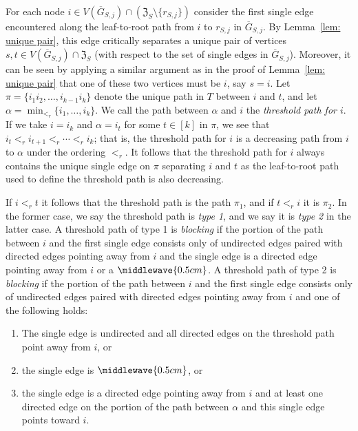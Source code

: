 For each node $i\in V(\overline{G}_{S,j})\cap(\mathfrak{Z}_S\setminus\{r_{S,j}\})$ consider the first single edge encountered along the leaf-to-root path from $i$ to $r_{S,j}$ in $\overline{G}_{S,j}$.  
By Lemma~\ref{lem: unique pair}, this edge critically separates a unique pair of vertices $s,t\in V(\overline{G}_{S,j})\cap\mathfrak{Z}_S$ (with respect to the set of single edges in $\overline{G}_{S,j}$). 
Moreover, it can be seen by applying a similar argument as in the proof of Lemma~\ref{lem: unique pair} that one of these two vertices must be $i$, say $s = i$. 
Let $\pi = \{i_1i_2,\ldots, i_{k-1}i_k\}$ denote the unique path in $T$ between $i$ and $t$, and let $\alpha = \min_{<_r}\{i_1,\ldots, i_k\}$. 
We call the path between $\alpha$ and $i$ the \emph{threshold path for $i$}.
If we take $i = i_k$ and $\alpha = i_t$ for some $t\in[k]$ in $\pi$, we see that $i_{t} <_r i_{t+1} <_r \cdots <_r i_k$; that is, the threshold path for $i$ is a decreasing path from $i$ to $\alpha$ under the ordering $<_r$. 
It follows that the threshold path for $i$ always contains the unique single edge on $\pi$ separating $i$ and $t$ as the leaf-to-root path used to define the threshold path is also decreasing. 

If $i<_r t$ it follows that the threshold path is the path $\pi_1$, and if $t <_r i$ it is $\pi_2$. 
In the former case, we say the threshold path is \emph{type 1}, and we say it is \emph{type 2} in the latter case. 
A threshold path of type 1 is \emph{blocking} if the portion of the path between $i$ and the first single edge consists only of undirected edges paired with directed edges pointing away from $i$ and the single edge is a directed edge pointing away from $i$ or a $\middlewave{0.5cm}$. 
A threshold path of type 2 is \emph{blocking} if the portion of the path between $i$ and the first single edge consists only of undirected edges paired with directed edges pointing away from $i$ and one of the following holds:
\begin{enumerate}
    \item The single edge is undirected and all directed edges on the threshold path point away from $i$, or
    \item the single edge is $\middlewave{0.5cm}$, or
    \item the single edge is a directed edge pointing away from $i$ and at least one directed edge on the portion of the path between $\alpha$ and this single edge points toward $i$. 

\end{enumerate}

